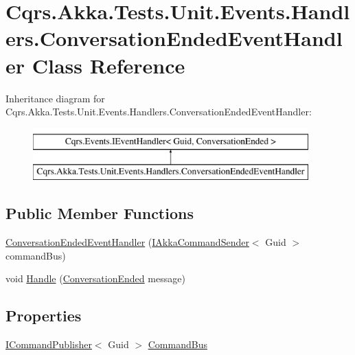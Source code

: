 \hypertarget{classCqrs_1_1Akka_1_1Tests_1_1Unit_1_1Events_1_1Handlers_1_1ConversationEndedEventHandler}{}\section{Cqrs.\+Akka.\+Tests.\+Unit.\+Events.\+Handlers.\+Conversation\+Ended\+Event\+Handler Class Reference}
\label{classCqrs_1_1Akka_1_1Tests_1_1Unit_1_1Events_1_1Handlers_1_1ConversationEndedEventHandler}
Inheritance diagram for Cqrs.\+Akka.\+Tests.\+Unit.\+Events.\+Handlers.\+Conversation\+Ended\+Event\+Handler\+:\begin{figure}[H]
\begin{center}
\leavevmode
\includegraphics[height=2.000000cm]{classCqrs_1_1Akka_1_1Tests_1_1Unit_1_1Events_1_1Handlers_1_1ConversationEndedEventHandler}
\end{center}
\end{figure}
\subsection*{Public Member Functions}
\begin{DoxyCompactItemize}
\item 
\hyperlink{classCqrs_1_1Akka_1_1Tests_1_1Unit_1_1Events_1_1Handlers_1_1ConversationEndedEventHandler_adf9143b7444b05fab2d43750fa7c89b8_adf9143b7444b05fab2d43750fa7c89b8}{Conversation\+Ended\+Event\+Handler} (\hyperlink{interfaceCqrs_1_1Akka_1_1Commands_1_1IAkkaCommandSender}{I\+Akka\+Command\+Sender}$<$ Guid $>$ command\+Bus)
\item 
void \hyperlink{classCqrs_1_1Akka_1_1Tests_1_1Unit_1_1Events_1_1Handlers_1_1ConversationEndedEventHandler_a1e363c715cefdb600705d7b3f5e3bca6_a1e363c715cefdb600705d7b3f5e3bca6}{Handle} (\hyperlink{classCqrs_1_1Akka_1_1Tests_1_1Unit_1_1Events_1_1ConversationEnded}{Conversation\+Ended} message)
\end{DoxyCompactItemize}
\subsection*{Properties}
\begin{DoxyCompactItemize}
\item 
\hyperlink{interfaceCqrs_1_1Commands_1_1ICommandPublisher}{I\+Command\+Publisher}$<$ Guid $>$ \hyperlink{classCqrs_1_1Akka_1_1Tests_1_1Unit_1_1Events_1_1Handlers_1_1ConversationEndedEventHandler_a2ad947f0ed860a416ba8a0795caa06d1_a2ad947f0ed860a416ba8a0795caa06d1}{Command\+Bus}
\end{DoxyCompactItemize}


